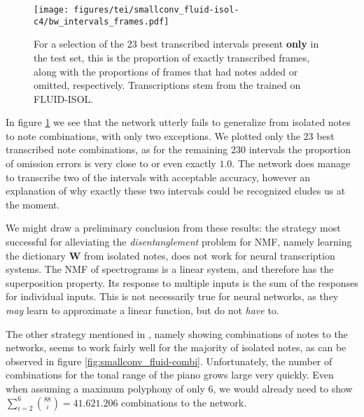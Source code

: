 \begin{figure}[ht]
  \centering
  \texttt{[image: figures/tei/smallconv\_fluid-isol-c4/bw\_intervals\_frames.pdf]}
  \caption{For a selection of the $23$ best transcribed intervals present \textbf{only} in the test set, this is the proportion of exactly transcribed frames, along with the proportions of frames that had notes added or omitted, respectively. Transcriptions stem from the  \SmallConvNet trained on FLUID-ISOL. \label{fig:smallconv_fluid-isol}}
\end{figure}

In figure \ref{fig:smallconv_fluid-isol} we see that the network utterly fails to generalize from isolated notes to note combinations, with only two exceptions. We plotted only the $23$ best transcribed note combinations, as for the remaining $230$ intervals the proportion of omission errors is very close to or even exactly $1.0$. The network does manage to transcribe two of the intervals with acceptable accuracy, however an explanation of why exactly these two intervals could be recognized eludes us at the moment.


We might draw a preliminary conclusion from these results: the strategy most successful for alleviating the \textit{disentanglement} problem for NMF, namely learning the dictionary $\textbf{W}$ from isolated notes, does not work for neural transcription systems. The NMF of spectrograms is a linear system, and therefore has the superposition property. Its response to multiple inputs is the sum of the responses for individual inputs. This is not necessarily true for neural networks, as they \textit{may} learn to approximate a linear function, but do not \textit{have} to.


The other strategy mentioned in \cite{Smaragdis_Brown_2003}, namely showing combinations of notes to the networks, seems to work fairly well for the majority of isolated notes, as can be observed in figure \ref{fig:smallconv_fluid-combi}. Unfortunately, the number of combinations for the tonal range of the piano grows large very quickly. Even when assuming a maximum polyphony of only $6$, we would already need to show $\sum_{i=2}^{6} \binom{88}{i} = 41.621.206$ combinations to the network.


